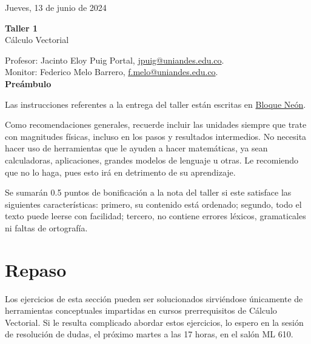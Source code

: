 \documentclass{fmbvecto}
\renewcommand{\title}{Taller 1}
\newcommand{\subject}{Cálculo Vectorial}
\begin{document}
Jueves, 13 de junio de 2024

\begin{center}
    \textbf{\LARGE \title} \\
    {\large \subject}
\end{center}


Profesor: Jacinto Eloy Puig Portal, \href{mailto:jpuig@uniandes.edu.co}{jpuig@uniandes.edu.co}. \\
Monitor: Federico Melo Barrero, \href{mailto:f.melo@uniandes.edu.co}{f.melo@uniandes.edu.co}.\\

\textbf{\Large Preámbulo}

Las instrucciones referentes a la entrega del taller están escritas en \href{https://bloqueneon.uniandes.edu.co/d2l/home}{Bloque Neón}.

Como recomendaciones generales, recuerde incluir las unidades siempre que trate con magnitudes físicas, incluso en los pasos y resultados intermedios. No necesita hacer uso de herramientas que le ayuden a hacer matemáticas, ya sean calculadoras, aplicaciones, grandes modelos de lenguaje u otras. Le recomiendo que no lo haga, pues esto irá en detrimento de su aprendizaje.

Se sumarán 0.5 puntos de bonificación a la nota del taller si este satisface las siguientes características: primero, su contenido está ordenado; segundo, todo el texto puede leerse con facilidad; tercero, no contiene errores léxicos, gramaticales ni faltas de ortografía.

\section{Repaso}

Los ejercicios de esta sección pueden ser solucionados sirviéndose únicamente de herramientas conceptuales impartidas en cursos prerrequisitos de Cálculo Vectorial. Si le resulta complicado abordar estos ejercicios, lo espero en la sesión de resolución de dudas, el próximo martes a las 17 horas, en el salón ML 610.
\end{document}
